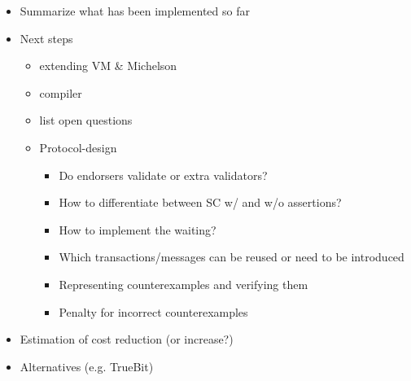 \draft{}
\begin{itemize}
\item Summarize what has been implemented so far
\item Next steps
	\begin{itemize}
	\item extending VM \& Michelson
	\item compiler
	\item list open questions
	\item Protocol-design
		\begin{itemize}
		\item Do endorsers validate or extra validators?
		\item How to differentiate between SC w/ and w/o assertions?
		\item How to implement the waiting?
		\item Which transactions/messages can be reused or need to be introduced
		\item Representing counterexamples and verifying them
		\item Penalty for incorrect counterexamples
		\end{itemize}
	\end{itemize}
\item Estimation of cost reduction (or increase?)
\item Alternatives (e.g. TrueBit)
\end{itemize}
